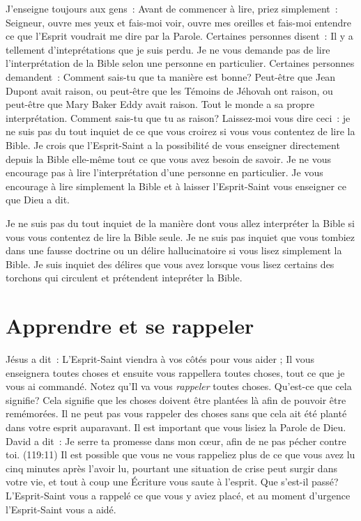 J'enseigne toujours aux gens~:
 \og Avant de commencer à lire, priez simplement~:
 \og Seigneur, ouvre mes yeux et fais-moi voir,
 ouvre mes oreilles et fais-moi entendre ce que l'Esprit
 voudrait me dire par la Parole. \fg{}
 Certaines personnes disent~:
 \og Il y a tellement d'inteprétations que je suis perdu. \fg{}
 Je ne vous demande pas de lire l'interprétation de la Bible
 selon une personne en particulier.
 Certaines personnes demandent~:
 \og Comment sais-tu que ta manière est bonne? Peut-être que Jean Dupont
 avait raison, ou peut-être que les Témoins de Jéhovah ont raison,
 ou peut-être que Mary Baker Eddy avait raison.
 Tout le monde a sa propre interprétation.
 Comment sais-tu que tu as raison? \fg{}
 Laissez-moi vous dire ceci~: je ne suis pas du tout inquiet
 de ce que vous croirez si vous vous contentez de lire la Bible.
 Je crois que l'Esprit-Saint a la possibilité de vous enseigner
 \ocadr directement depuis la Bible elle-même \fcadr{}
 tout ce que vous avez besoin de savoir.
 Je ne vous encourage pas à lire l'interprétation d'une personne
 en particulier. Je vous encourage à lire simplement la Bible
 et à laisser l'Esprit-Saint vous enseigner ce que Dieu a dit.

Je ne suis pas du tout inquiet de la manière dont vous allez interpréter
 la Bible si vous vous contentez de lire la Bible seule.
 Je ne suis pas inquiet que vous tombiez dans une fausse doctrine
 ou un délire hallucinatoire si vous lisez simplement la Bible.
 Je suis inquiet des délires que vous avez lorsque vous lisez certains
 des torchons qui circulent et prétendent intepréter la Bible.


\section*{Apprendre et se rappeler}

Jésus a dit~: \og L'Esprit-Saint viendra à vos côtés pour vous aider ;
 Il vous enseignera toutes choses et ensuite vous rappellera toutes choses,
 tout ce que je vous ai commandé. \fg{}
 Notez qu'Il va vous \emph{rappeler} toutes choses.
 Qu'est-ce que cela signifie? Cela signifie que les choses
 doivent être plantées là afin de pouvoir être remémorées.
 Il ne peut pas vous rappeler des choses sans que cela ait été planté
 dans votre esprit auparavant. Il est important que vous lisiez
 la Parole de Dieu. David a dit~: \og Je serre ta promesse dans mon cœur,
 afin de ne pas pécher contre toi. \fg{} (119:11)
 Il est possible que vous ne vous rappeliez plus de ce que vous avez lu
 cinq minutes après l'avoir lu, pourtant une situation de crise
 peut surgir dans votre vie, et tout à coup une Écriture vous saute
 à l'esprit. Que s'est-il passé? L'Esprit-Saint vous a rappelé
 ce que vous y aviez placé, et au moment d'urgence l'Esprit-Saint
 vous a aidé.

